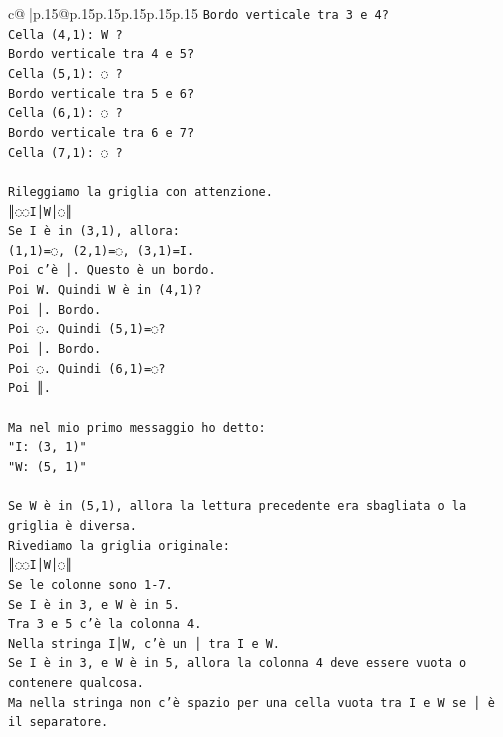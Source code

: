 \documentclass{article}
\begin{document}
{\begin{supertabular}{c@{$\;$}|p{.15\linewidth}@{}p{.15\linewidth}p{.15\linewidth}p{.15\linewidth}p{.15\linewidth}p{.15\linewidth}}
{{{\texttt{Bordo verticale tra 3 e 4?} \\
\texttt{Cella (4,1): W ?} \\
\texttt{Bordo verticale tra 4 e 5?} \\
\texttt{Cella (5,1): ◌ ?} \\
\texttt{Bordo verticale tra 5 e 6?} \\
\texttt{Cella (6,1): ◌ ?} \\
\texttt{Bordo verticale tra 6 e 7?} \\
\texttt{Cella (7,1): ◌ ?} \\
\\ 
\texttt{Rileggiamo la griglia con attenzione.} \\
\texttt{║◌◌I│W│◌║} \\
\texttt{Se I è in (3,1), allora:} \\
\texttt{(1,1)=◌, (2,1)=◌, (3,1)=I.} \\
\texttt{Poi c'è │. Questo è un bordo.} \\
\texttt{Poi W. Quindi W è in (4,1)?} \\
\texttt{Poi │. Bordo.} \\
\texttt{Poi ◌. Quindi (5,1)=◌?} \\
\texttt{Poi │. Bordo.} \\
\texttt{Poi ◌. Quindi (6,1)=◌?} \\
\texttt{Poi ║.} \\
\\ 
\texttt{Ma nel mio primo messaggio ho detto:} \\
\texttt{"I: (3, 1)"} \\
\texttt{"W: (5, 1)"} \\
\\ 
\texttt{Se W è in (5,1), allora la lettura precedente era sbagliata o la griglia è diversa.} \\
\texttt{Rivediamo la griglia originale:} \\
\texttt{║◌◌I│W│◌║} \\
\texttt{Se le colonne sono 1{-}7.} \\
\texttt{Se I è in 3, e W è in 5.} \\
\texttt{Tra 3 e 5 c'è la colonna 4.} \\
\texttt{Nella stringa I│W, c'è un │ tra I e W.} \\
\texttt{Se I è in 3, e W è in 5, allora la colonna 4 deve essere vuota o contenere qualcosa.} \\
\texttt{Ma nella stringa non c'è spazio per una cella vuota tra I e W se │ è il separatore.} \\
}}}
\end{supertabular}}
\end{document}

